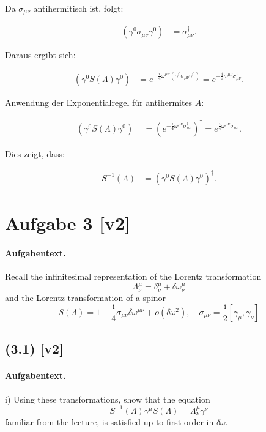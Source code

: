 \documentclass[11pt,a4paper]{article}
\begin{document}
Da \( \sigma_{\mu \nu} \) antihermitisch ist, folgt:

\begin{align*}
(\gamma^0 \sigma_{\mu \nu} \gamma^0) &= \sigma_{\mu \nu}^\dagger.
\end{align*}

Daraus ergibt sich:

\begin{align*}
\left(\gamma^0 S(\Lambda) \gamma^0\right) &= e^{-\frac{i}{4} \omega^{\mu \nu} (\gamma^0 \sigma_{\mu \nu} \gamma^0)} = e^{-\frac{i}{4} \omega^{\mu \nu} \sigma_{\mu \nu}^\dagger}.
\end{align*}

Anwendung der Exponentialregel für antihermites \( A \):

\begin{align*}
\left(\gamma^0 S(\Lambda) \gamma^0\right)^{\dagger} &= \left(e^{-\frac{i}{4} \omega^{\mu \nu} \sigma_{\mu \nu}^\dagger}\right)^{\dagger} = e^{\frac{i}{4} \omega^{\mu \nu} \sigma_{\mu \nu}}.
\end{align*}

Dies zeigt, dass:

\begin{align*}
S^{-1}(\Lambda) &= \left(\gamma^0 S(\Lambda) \gamma^0\right)^{\dagger}.
\end{align*}


\section*{Aufgabe 3 [v2]}
\paragraph{Aufgabentext.}
Recall the infinitesimal representation of the Lorentz transformation
$$
\Lambda_\nu^\mu=\delta_\nu^\mu+\delta \omega_\nu^\mu
$$
and the Lorentz transformation of a spinor
$$
S(\Lambda)=1-\frac{\mathrm{i}}{4} \sigma_{\mu \nu} \delta \omega^{\mu \nu}+o\left(\delta \omega^2\right), \quad \sigma_{\mu \nu}=\frac{\mathrm{i}}{2}\left[\gamma_\mu, \gamma_\nu\right]
$$

\subsection*{(3.1) [v2]}
\paragraph{Aufgabentext.}
i) Using these transformations, show that the equation
$$
S^{-1}(\Lambda) \gamma^\mu S(\Lambda)=\Lambda_\nu^\mu \gamma^\nu
$$
familiar from the lecture, is satisfied up to first order in $\delta \omega$.
\end{document}
